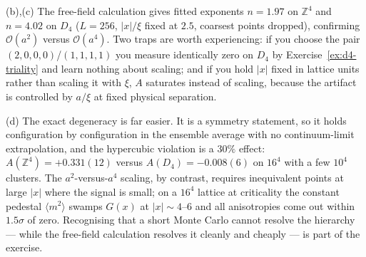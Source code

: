 {(b),(c) The free-field calculation gives fitted exponents
$n=1.97$ on $\mathbb{Z}^4$ and $n=4.02$ on $D_4$ ($L=256$, $|x|/\xi$ fixed at
$2.5$, coarsest points dropped), confirming $\mathcal{O}(a^2)$ versus
$\mathcal{O}(a^4)$. Two traps are worth experiencing: if you choose the pair
$(2,0,0,0)$/$(1,1,1,1)$ you measure identically zero on $D_4$ by
Exercise~\ref{ex:d4-triality} and learn nothing about scaling; and if you hold
$|x|$ fixed in lattice units rather than scaling it with $\xi$, $A$ saturates
instead of scaling, because the artifact is controlled by $a/\xi$ at fixed
physical separation.

(d) The exact degeneracy is far easier. It is a symmetry statement, so it holds
configuration by configuration in the ensemble average with no
continuum-limit extrapolation, and the hypercubic violation is a $30\%$ effect:
$A(\mathbb{Z}^4)=+0.331(12)$ versus $A(D_4)=-0.008(6)$ on $16^4$ with a few
$10^4$ clusters. The $a^2$-versus-$a^4$ scaling, by contrast, requires
inequivalent points at large $|x|$ where the signal is small; on a $16^4$
lattice at criticality the constant pedestal $\langle m^2\rangle$ swamps $G(x)$
at $|x|\sim4$--$6$ and all anisotropies come out within $1.5\sigma$ of zero.
Recognising that a short Monte Carlo cannot resolve the hierarchy --- while the
free-field calculation resolves it cleanly and cheaply --- is part of the
exercise.}

